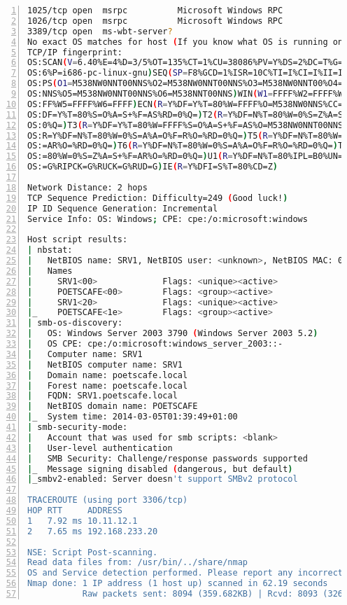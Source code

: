 \begin{lstlisting}[language=sh,numbers=left,numberstyle=\tiny,columns=fullflexible,basicstyle=\footnotesize\ttfamily, breaklines=true, breakautoindent=true, breakindent=4em]
1025/tcp open  msrpc          Microsoft Windows RPC
1026/tcp open  msrpc          Microsoft Windows RPC
3389/tcp open  ms-wbt-server?
No exact OS matches for host (If you know what OS is running on it, see http://nmap.org/submit/ ).
TCP/IP fingerprint:
OS:SCAN(V=6.40%E=4%D=3/5%OT=135%CT=1%CU=38086%PV=Y%DS=2%DC=T%G=Y%TM=531663E
OS:6%P=i686-pc-linux-gnu)SEQ(SP=F8%GCD=1%ISR=10C%TI=I%CI=I%II=I%SS=S%TS=0)O
OS:PS(O1=M538NW0NNT00NNS%O2=M538NW0NNT00NNS%O3=M538NW0NNT00%O4=M538NW0NNT00
OS:NNS%O5=M538NW0NNT00NNS%O6=M538NNT00NNS)WIN(W1=FFFF%W2=FFFF%W3=FFFF%W4=FF
OS:FF%W5=FFFF%W6=FFFF)ECN(R=Y%DF=Y%T=80%W=FFFF%O=M538NW0NNS%CC=N%Q=)T1(R=Y%
OS:DF=Y%T=80%S=O%A=S+%F=AS%RD=0%Q=)T2(R=Y%DF=N%T=80%W=0%S=Z%A=S%F=AR%O=%RD=
OS:0%Q=)T3(R=Y%DF=Y%T=80%W=FFFF%S=O%A=S+%F=AS%O=M538NW0NNT00NNS%RD=0%Q=)T4(
OS:R=Y%DF=N%T=80%W=0%S=A%A=O%F=R%O=%RD=0%Q=)T5(R=Y%DF=N%T=80%W=0%S=Z%A=S+%F
OS:=AR%O=%RD=0%Q=)T6(R=Y%DF=N%T=80%W=0%S=A%A=O%F=R%O=%RD=0%Q=)T7(R=Y%DF=N%T
OS:=80%W=0%S=Z%A=S+%F=AR%O=%RD=0%Q=)U1(R=Y%DF=N%T=80%IPL=B0%UN=0%RIPL=G%RID
OS:=G%RIPCK=G%RUCK=G%RUD=G)IE(R=Y%DFI=S%T=80%CD=Z)

Network Distance: 2 hops
TCP Sequence Prediction: Difficulty=249 (Good luck!)
IP ID Sequence Generation: Incremental
Service Info: OS: Windows; CPE: cpe:/o:microsoft:windows

Host script results:
| nbstat: 
|   NetBIOS name: SRV1, NetBIOS user: <unknown>, NetBIOS MAC: 00:0c:29:01:5a:72 (VMware)
|   Names
|     SRV1<00>             Flags: <unique><active>
|     POETSCAFE<00>        Flags: <group><active>
|     SRV1<20>             Flags: <unique><active>
|_    POETSCAFE<1e>        Flags: <group><active>
| smb-os-discovery: 
|   OS: Windows Server 2003 3790 (Windows Server 2003 5.2)
|   OS CPE: cpe:/o:microsoft:windows_server_2003::-
|   Computer name: SRV1
|   NetBIOS computer name: SRV1
|   Domain name: poetscafe.local
|   Forest name: poetscafe.local
|   FQDN: SRV1.poetscafe.local
|   NetBIOS domain name: POETSCAFE
|_  System time: 2014-03-05T01:39:49+01:00
| smb-security-mode: 
|   Account that was used for smb scripts: <blank>
|   User-level authentication
|   SMB Security: Challenge/response passwords supported
|_  Message signing disabled (dangerous, but default)
|_smbv2-enabled: Server doesn't support SMBv2 protocol

TRACEROUTE (using port 3306/tcp)
HOP RTT     ADDRESS
1   7.92 ms 10.11.12.1
2   7.65 ms 192.168.233.20

NSE: Script Post-scanning.
Read data files from: /usr/bin/../share/nmap
OS and Service detection performed. Please report any incorrect results at http://nmap.org/submit/ .
Nmap done: 1 IP address (1 host up) scanned in 62.19 seconds
           Raw packets sent: 8094 (359.682KB) | Rcvd: 8093 (326.558KB)

\end{lstlisting}
